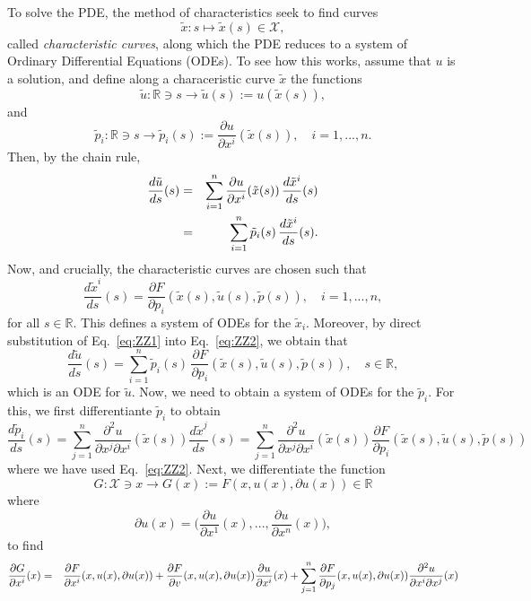 \documentclass[11pt,spanish]{article}
\newcommand{\RR}{\mathbb{R}}
\begin{document}
To solve the PDE, the method of characteristics seek to find curves
$$
\tilde x:s\mapsto \tilde x(s)\in\mathcal X,
$$
called {\em characteristic curves}, along which the PDE reduces to a system of Ordinary Differential Equations (ODEs).
To see how this works, assume that $u$ is a solution, and define along a characeristic curve $\tilde x$ the functions
$$
\tilde u:\RR\ni s\to \tilde u(s):=u(\tilde x(s)),
$$
and
$$
\tilde p_i:\RR\ni s\to \tilde p_i(s):=\frac{\partial u}{\partial x^i}(\tilde x(s)),
\quad
i=1,...,n.
$$
Then, by the chain rule,
\begin{eqnarray}
\label{eq:ZZ1}
\frac{d\tilde u}{ds}(s)
&=&
\sum_{i=1}^n
\frac{\partial u}{\partial x^i}(\tilde{x}(s))
\,
\frac{d \tilde x^i}{ds}(s)
\\
&=&
\sum_{i=1}^n
\tilde p_i(s)
\,
\frac{d\tilde x^i}{ds}(s)
.
\notag
\end{eqnarray}
Now, and crucially, the characteristic curves are chosen such that
\begin{equation}
\label{eq:ZZ2}
\frac{d\tilde x^i}{ds}(s)
=
\frac{\partial F}{\partial p_i}(\tilde x(s),\tilde u(s),\tilde p(s)),
\quad
i=1,...,n,
\end{equation}
for all $s\in \RR$.
This defines a system of ODEs for the $\tilde{x}_i$.
Moreover, by direct substitution of Eq.~\ref{eq:ZZ1} into Eq.~\ref{eq:ZZ2}, we obtain that
\begin{equation}
\label{eq:ZZ1a}
\frac{d\tilde u}{ds}(s)
=
\sum_{i=1}^n
\tilde p_i(s)\,
\frac{\partial F}{\partial p_i}(\tilde x(s),\tilde u(s),\tilde p(s)),
\quad 
s\in \RR,
\end{equation}
which is an ODE for $\tilde{u}$.
Now, we need to obtain a system of ODEs for the $\tilde{p}_i$.
For this, we first differentiante $\tilde p_i$ to obtain
\begin{equation}
\label{eq:UU3}
\frac{d\tilde p_i}{ds}(s)
=
\sum_{j=1}^n
\frac{\partial^2 u}{\partial x^j \partial x^i}(\tilde x(s))
\frac{d \tilde x^j}{ds}(s)
=
\sum_{j=1}^n
\frac{\partial^2 u}{\partial x^j \partial x^i}(\tilde x(s))
\frac{\partial F}{\partial p_i}(\tilde x(s),\tilde u(s),\tilde p(s))
\end{equation}
where we have used Eq.~\ref{eq:ZZ2}.
Next, we differentiate the function
$$
G:\mathcal X\ni x\to G(x) := F(x,u(x),\partial u(x)) \in \RR
$$
where
$$
\partial u(x)
=
\bigg(\frac{\partial u}{\partial x^1}(x),...,\frac{\partial u}{\partial x^n}(x)\bigg),
$$
to find
\begin{eqnarray}
\frac{\partial G}{\partial x^i}(x)
&=&
\frac{\partial F}{\partial x^i}(x,u(x),\partial u(x))
+
\frac{\partial F}{\partial v}(x,u(x),\partial u(x))
\frac{\partial u}{\partial x^i}(x)
+
\sum_{j=1}^n
\frac{\partial F}{\partial p_j}(x,u(x),\partial u(x))
\frac{\partial^2 u}{\partial x^i\partial x^j}(x)
\notag
\end{eqnarray}
\end{document}
